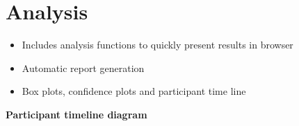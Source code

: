 \vspace{-0.8cm}

{\color{emphasisered} \section{Analysis}}


\normalsize

\begin{itemize}%
	\item Includes analysis functions to quickly present results in browser
	\item Automatic report generation
	\item Box plots, confidence plots and participant time line
\end{itemize}
\vspace{-1cm}

\begin{center}
\small
\textbf{Participant timeline diagram}
\end{center}

\vspace{-0.3cm}
